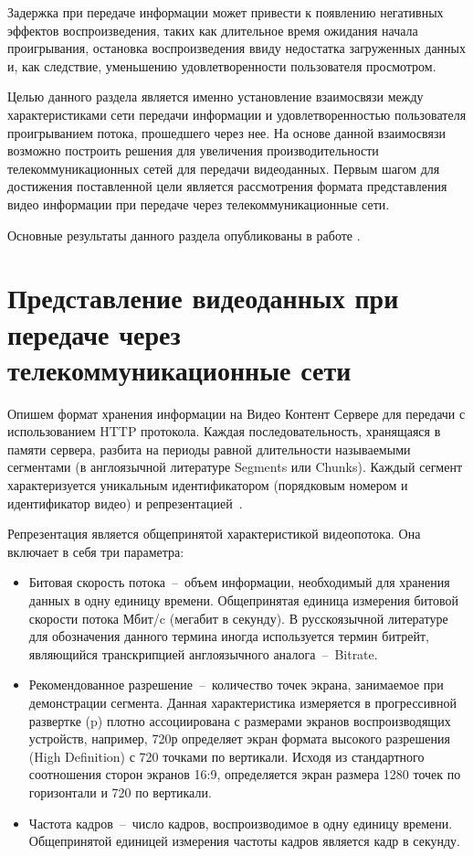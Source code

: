 Задержка при передаче информации может привести к появлению негативных эффектов воспроизведения, таких как длительное время ожидания начала проигрывания, остановка воспроизведения ввиду недостатка загруженных данных и, как следствие, уменьшению удовлетворенности пользователя просмотром.

Целью данного раздела является именно установление взаимосвязи между характеристиками сети передачи информации и удовлетворенностью пользователя проигрыванием потока, прошедшего через нее. На основе данной взаимосвязи возможно построить решения для увеличения производительности телекоммуникационных сетей для передачи видеоданных. Первым шагом для достижения поставленной цели является рассмотрения формата представления видео информации при передаче через телекоммуникационные сети.

Основные результаты данного раздела опубликованы в работе \cite{past_ius}.

\section{Представление видеоданных при передаче через телекоммуникационные сети}
\label{chap1:VideoFormat}

Опишем формат хранения информации на Видео Контент Сервере для передачи с использованием HTTP протокола. Каждая последовательность, хранящаяся в памяти сервера, разбита на периоды равной длительности называемыми сегментами (в англоязычной литературе Segments или Chunks). Каждый сегмент характеризуется уникальным идентификатором (порядковым номером и идентификатор видео) и репрезентацией~\cite{dash_standard}.

Репрезентация является общепринятой характеристикой видеопотока. Она включает в себя три параметра:
\begin{itemize}
  \item Битовая скорость потока~--~объем информации, необходимый для хранения данных в одну единицу времени. Общепринятая единица измерения битовой скорости потока Мбит/c (мегабит в секунду). В русскоязычной литературе для обозначения данного термина иногда используется термин битрейт, являющийся транскрипцией англоязычного аналога~--~Bitrate.
  \item Рекомендованное разрешение~--~количество точек экрана, занимаемое при демонстрации сегмента. Данная характеристика измеряется в прогрессивной развертке (p) плотно ассоциирована с размерами экранов воспроизводящих устройств, например, 720р определяет экран формата высокого разрешения (High Definition) с 720 точками по вертикали. Исходя из стандартного соотношения сторон экранов 16:9, определяется экран размера 1280 точек по горизонтали и 720 по вертикали.
  \item Частота кадров~--~число кадров, воспроизводимое в одну единицу времени. Общепринятой единицей измерения частоты кадров является кадр в секунду.
\end{itemize}

